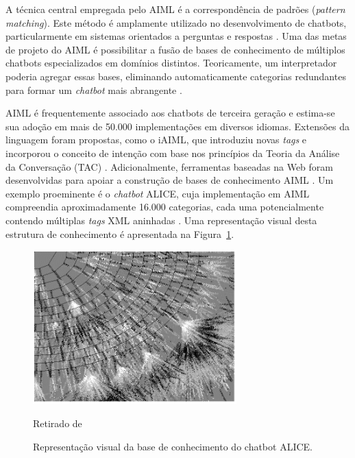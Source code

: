 \documentclass[14pt,a4paper,oneside]{book}
\begin{document}
A técnica central empregada pelo AIML é a correspondência de padrões (\emph{pattern matching}). Este método é amplamente utilizado no desenvolvimento de chatbots, particularmente em sistemas orientados a perguntas e respostas \cite{Abdul-Kader2015}. Uma das metas de projeto do AIML é possibilitar a fusão de bases de conhecimento de múltiplos chatbots especializados em domínios distintos. Teoricamente, um interpretador poderia agregar essas bases, eliminando automaticamente categorias redundantes para formar um \emph{chatbot} mais abrangente \cite{Wallace2000}.

AIML é frequentemente associado aos chatbots de terceira geração \cite{Maria2010} e estima-se sua adoção em mais de 50.000 implementações em diversos idiomas. 
Extensões da linguagem foram propostas, como o iAIML, que introduziu novas \emph{tags} e incorporou o conceito de intenção com base nos princípios da Teoria da Análise da Conversação (TAC) \cite{Neves2005}. Adicionalmente, ferramentas baseadas na Web foram desenvolvidas para apoiar a construção de bases de conhecimento AIML \cite{Krassmann2017}. Um exemplo proeminente é o \emph{chatbot} ALICE, cuja implementação em AIML compreendia aproximadamente 16.000 categorias, cada uma potencialmente contendo múltiplas \emph{tags} XML aninhadas \cite{Wallace2000}. Uma representação visual desta estrutura de conhecimento é apresentada na Figura~\ref{fig:representacaovisual}.

\begin{figure}
    \centering
    \caption{Representação visual da base de conhecimento do chatbot ALICE.}
    \includegraphics[width=0.7\textwidth]{./fig/image9.png} %
    \label{fig:representacaovisual}
    \vspace{0.2cm} %
    {\footnotesize 
	
	Retirado de \cite{Wallace2003}}
\end{figure}
\end{document}
